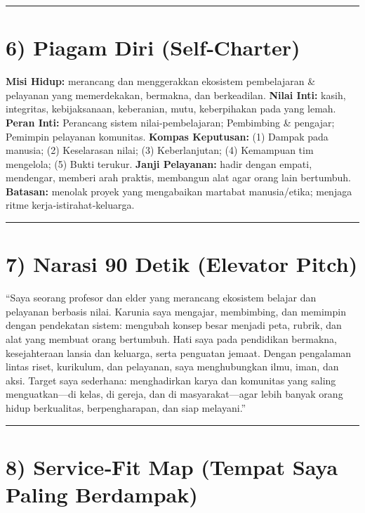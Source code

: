 \documentclass[
  letterpaper,
  DIV=11,
  numbers=noendperiod]{scrreprt}
\begin{document}
\begin{center}\rule{0.5\linewidth}{0.5pt}\end{center}

\section{6) Piagam Diri (Self‑Charter)}\label{piagam-diri-selfcharter}

\textbf{Misi Hidup:} merancang dan menggerakkan ekosistem pembelajaran
\& pelayanan yang memerdekakan, bermakna, dan berkeadilan. \textbf{Nilai
Inti:} kasih, integritas, kebijaksanaan, keberanian, mutu, keberpihakan
pada yang lemah. \textbf{Peran Inti:} Perancang sistem
nilai‑pembelajaran; Pembimbing \& pengajar; Pemimpin pelayanan
komunitas. \textbf{Kompas Keputusan:} (1) Dampak pada manusia; (2)
Keselarasan nilai; (3) Keberlanjutan; (4) Kemampuan tim mengelola; (5)
Bukti terukur. \textbf{Janji Pelayanan:} hadir dengan empati, mendengar,
memberi arah praktis, membangun alat agar orang lain bertumbuh.
\textbf{Batasan:} menolak proyek yang mengabaikan martabat
manusia/etika; menjaga ritme kerja‑istirahat‑keluarga.

\begin{center}\rule{0.5\linewidth}{0.5pt}\end{center}

\section{7) Narasi 90 Detik (Elevator
Pitch)}\label{narasi-90-detik-elevator-pitch}

``Saya seorang profesor dan elder yang merancang ekosistem belajar dan
pelayanan berbasis nilai. Karunia saya mengajar, membimbing, dan
memimpin dengan pendekatan sistem: mengubah konsep besar menjadi peta,
rubrik, dan alat yang membuat orang bertumbuh. Hati saya pada pendidikan
bermakna, kesejahteraan lansia dan keluarga, serta penguatan jemaat.
Dengan pengalaman lintas riset, kurikulum, dan pelayanan, saya
menghubungkan ilmu, iman, dan aksi. Target saya sederhana: menghadirkan
karya dan komunitas yang saling menguatkan---di kelas, di gereja, dan di
masyarakat---agar lebih banyak orang hidup berkualitas, berpengharapan,
dan siap melayani.''

\begin{center}\rule{0.5\linewidth}{0.5pt}\end{center}

\section{8) Service‑Fit Map (Tempat Saya Paling
Berdampak)}\label{servicefit-map-tempat-saya-paling-berdampak}
\end{document}
